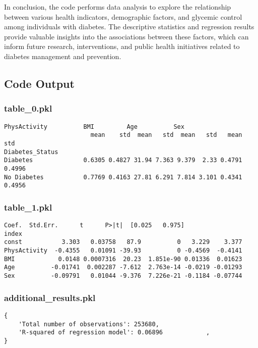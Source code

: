\documentclass[11pt]{article}
\begin{document}
In conclusion, the code performs data analysis to explore the relationship between various health indicators, demographic factors, and glycemic control among individuals with diabetes. The descriptive statistics and regression results provide valuable insights into the associations between these factors, which can inform future research, interventions, and public health initiatives related to diabetes management and prevention.

\subsection{Code Output}

\subsubsection*{table\_0.pkl}

\begin{Verbatim}[tabsize=4]
                PhysActivity          BMI         Age          Sex
                        mean    std  mean   std  mean   std   mean    std
Diabetes_Status
Diabetes              0.6305 0.4827 31.94 7.363 9.379  2.33 0.4791 0.4996
No Diabetes           0.7769 0.4163 27.81 6.291 7.814 3.101 0.4341 0.4956
\end{Verbatim}

\subsubsection*{table\_1.pkl}

\begin{Verbatim}[tabsize=4]
                Coef.  Std.Err.      t      P>|t|  [0.025   0.975]
index
const           3.303   0.03758   87.9          0   3.229    3.377
PhysActivity  -0.4355   0.01091 -39.93          0 -0.4569  -0.4141
BMI            0.0148 0.0007316  20.23  1.851e-90 0.01336  0.01623
Age          -0.01741  0.002287 -7.612  2.763e-14 -0.0219 -0.01293
Sex          -0.09791   0.01044 -9.376  7.226e-21 -0.1184 -0.07744
\end{Verbatim}

\subsubsection*{additional\_results.pkl}

\begin{Verbatim}[tabsize=4]
{
    'Total number of observations': 253680,
    'R-squared of regression model': 0.06896            ,
}
\end{Verbatim}
\end{document}
